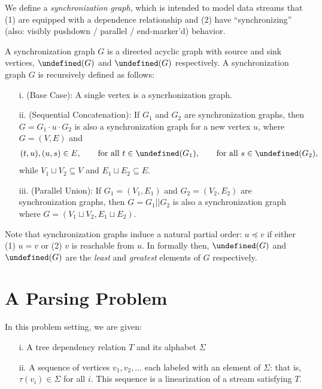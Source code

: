 \documentclass[12pt]{article}
\let\sources\undefined
\newcommand{\sources}{\mathbf{sources}}
\let\sinks\undefined
\newcommand{\sinks}{\mathbf{sinks}}
\begin{document}
We define a \textit{synchronization graph},
which is intended to model data streams that
(1) are equipped with a dependence relationship
and (2) have ``synchronizing''
(also: visibly pushdown / parallel / end-marker'd) behavior.

\begin{definition}
  A synchronization graph \(G\) is a directed acyclic graph
  with source and sink vertices,
  \(\sources(G)\) and \(\sinks(G)\) respectively.
  A synchronization graph \(G\) is recursively defined as follows:
  \begin{enumerate}
    \item[i.] (Base Case):
      A single vertex is a syncrhonization graph.

    \item[ii.] (Sequential Concatenation):
      If \(G_1\) and \(G_2\) are synchronization graphs,
      then \(G = G_1 \cdot u \cdot G_2\)
      is also a synchronization graph
      for a new vertex \(u\), where \(G = (V, E)\) and
      \begin{align*}
        (t, u), (u, s) \in E,
          \qquad \text{for all \(t \in \sinks(G_1)\)},
          \qquad \text{for all \(s \in \sources(G_2)\)},
      \end{align*}
      while \(V_1 \sqcup V_2 \subseteq V\)
      and \(E_1 \sqcup E_2 \subseteq E\).

    \item[iii.] (Parallel Union):
      If \(G_1 = (V_1, E_1)\) and \(G_2 = (V_2, E_2)\)
      are synchronization graphs,
      then \(G = G_1 || G_2\) is also a synchronization graph
      where \(G = (V_1 \sqcup V_2, E_1 \sqcup E_2)\).

  \end{enumerate}
\end{definition}

Note that synchronization graphs induce a natural partial order:
\(u \preceq v\) if either (1) \(u = v\) or (2) \(v\) is reachable from \(u\).
In formally then, \(\sources (G)\) and \(\sinks(G)\)
are the \textit{least} and \textit{greatest} elements of \(G\) respectively.


\section{A Parsing Problem}
In this problem setting, we are given:
\begin{enumerate}
  \item[i.] A tree dependency relation \(T\) and its alphabet \(\Sigma\)

  \item[ii.]
    A sequence of vertices \(v_1, v_2, \ldots\)
    each labeled with an element of \(\Sigma\):
    that is, \(\tau(v_i) \in \Sigma\) for all \(i\).
    This sequence is a linearization of a stream satisfying \(T\).

\end{enumerate}
\end{document}
